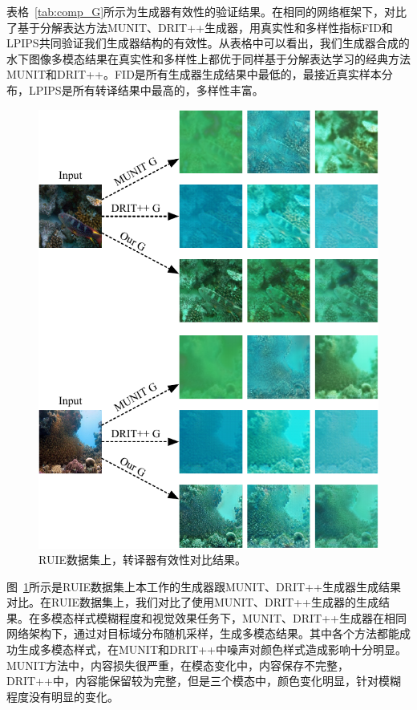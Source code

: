 表格~\ref{tab:comp_G}所示为生成器有效性的验证结果。在相同的网络框架下，对比了基于分解表达方法MUNIT、DRIT++生成器，用真实性和多样性指标FID和LPIPS共同验证我们生成器结构的有效性。从表格中可以看出，我们生成器合成的水下图像多模态结果在真实性和多样性上都优于同样基于分解表达学习的经典方法MUNIT和DRIT++。FID是所有生成器生成结果中最低的，最接近真实样本分布，LPIPS是所有转译结果中最高的，多样性丰富。

\begin{figure}[htp]
    \centering
  \includegraphics[width=\textwidth]{figures/Ablation_modal_ruie.pdf}
  \caption{RUIE数据集上，转译器有效性对比结果。}
  \label{fig:ablation_modal_ruie}
\end{figure}

图~\ref{fig:ablation_modal_ruie}所示是RUIE数据集上本工作的生成器跟MUNIT、DRIT++生成器生成结果对比。在RUIE数据集上，我们对比了使用MUNIT、DRIT++生成器的生成结果。在多模态样式模糊程度和视觉效果任务下，MUNIT、DRIT++生成器在相同网络架构下，通过对目标域分布随机采样，生成多模态结果。其中各个方法都能成功生成多模态样式，在MUNIT和DRIT++中噪声对颜色样式造成影响十分明显。MUNIT方法中，内容损失很严重，在模态变化中，内容保存不完整，DRIT++中，内容能保留较为完整，但是三个模态中，颜色变化明显，针对模糊程度没有明显的变化。

